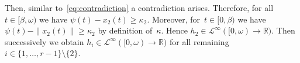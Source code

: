 \documentclass[ envcountsect, envcountsame]{svjour3}
\newcommand{\ddt}{\tfrac{\text{\normalfont d}}{\text{\normalfont d}t}}
\newcommand{\dt}{\text{\normalfont d}t}
\newcommand{\R}{\mathbb{R}}
\newcommand{\cL}{\mathcal{L}}
\begin{document}
%

%
Then, similar to~\eqref{eq:contradiction} a contradiction arises.
Therefore, for all $t \in [\beta, \omega)$ we have $\psi(t) - x_2(t) \ge \kappa_2$. %
Moreover, for~$t \in [0,\beta)$ we have $\psi(t) - \|x_2(t)\| \ge \kappa_2$ by definition of~$ \kappa$. Hence $h_2 \in \cL^{\infty}([0,\omega) \to \R)$.
Then successively we obtain $h_i \in \cL^\infty([0,\omega) \to \R)$ for all remaining ${i \in \{1,\ldots,r-1\}\setminus\{2\}}$.
\end{document}
